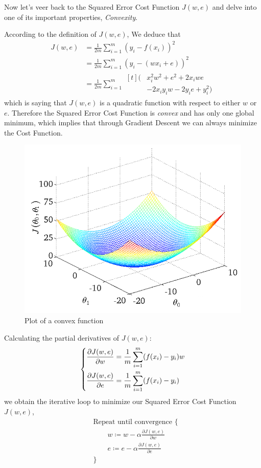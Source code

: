 \documentclass[12pt, twoside]{article}
\begin{document}
\begin{multicols*}{2}
		Now let's veer back to the Squared Error Cost Function $J(w,e)$ and delve into one of its important properties, \textit{Convexity}.
		
		According to the definition of $ J(w,e)$, We deduce that
		\begin{align*}
			J(w,e) &= \frac{1}{2m}\sum_{i=1}^{m}(y_i - f(x_i))^2\\
			&= \frac{1}{2m}\sum_{i=1}^{m}(y_i - (wx_i+e))^2\\
			&= \frac{1}{2m}\sum_{i=1}^{m}
			\begin{aligned}[t]
				(&x_i^2w^2 + e^2 + 2x_iwe \\
				&- 2x_iy_iw -2y_ie + y_i^2)
			\end{aligned}
		\end{align*}
		which is saying that $J(w,e)$ is a quadratic function with respect to either $w$ or $e$. Therefore the Squared Error Cost Function is \textit{convex} and has only one global minimum, which implies that through Gradient Descent we can always minimize the Cost Function.
		\begin{figure}[H]
			\centering
			\includegraphics[width=\columnwidth]{convex-function}
			\caption{Plot of a convex function}
			\label{fig:Convex}
		\end{figure}
		
		Calculating the partial derivatives of $J(w,e)$:
		$$
		\begin{dcases}
			\frac{\partial J(w,e)}{\partial w}=\frac{1}{m}\sum_{i=1}^{m}(f(x_i)-y_i)w \\
			\frac{\partial J(w,e)}{\partial e}=\frac{1}{m}\sum_{i=1}^{m}(f(x_i)-y_i)
		\end{dcases}
		$$
		we obtain the iterative loop to minimize our Squared Error Cost Function $J(w,e)$,
		\begin{align*}
			&\text{Repeat until convergence \{}\\
				&\qquad w\coloneq w-\alpha\frac{\partial J(w,e)}{\partial w} \\
				&\qquad e\coloneq e-\alpha\frac{\partial J(w,e)}{\partial e} \\
			&\text{\}}
		\end{align*}
		

\end{multicols*}
\end{document}
